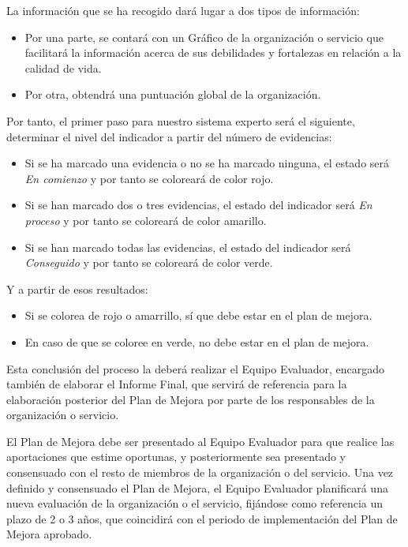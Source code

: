 La información que se ha recogido dará lugar a dos tipos de información: 
\begin{itemize}
	\item Por una parte, se contará con un Gráfico de la organización o servicio que facilitará la información acerca de sus debilidades y fortalezas en relación a la calidad de vida.
	\item Por otra, obtendrá una puntuación global de la organización. 
\end{itemize}

Por tanto, el primer paso para nuestro sistema experto será el siguiente, determinar el nivel del indicador a partir del número de evidencias:
\begin{itemize}
	\item Si se ha marcado una evidencia o no se ha marcado ninguna, el estado será \textit{En comienzo} y por tanto se coloreará de color rojo.
	\item Si se han marcado dos o tres evidencias, el estado del indicador será \textit{En proceso} y por tanto se coloreará de color amarillo.
	\item Si se han marcado todas las evidencias, el estado del indicador será \textit{Conseguido} y por tanto se coloreará de color verde.
\end{itemize}

Y a partir de esos resultados:
\begin{itemize}
	\item Si se colorea de rojo o amarrillo, sí que debe estar en el plan de mejora.
	\item En caso de que se coloree en verde, no debe estar en el plan de mejora.
\end{itemize}
 
Esta conclusión del proceso la deberá realizar el Equipo Evaluador, encargado
también de elaborar el Informe Final, que servirá de referencia
para la elaboración posterior del Plan de Mejora por parte de los
responsables de la organización o servicio.  
 
El Plan de Mejora debe ser presentado al Equipo Evaluador para que realice las
aportaciones que estime oportunas, y posteriormente sea presentado y consensuado
con el resto de miembros de la organización o del servicio. Una vez definido y
consensuado el Plan de Mejora, el Equipo Evaluador planificará una nueva
evaluación de la organización o el servicio, fijándose como referencia un plazo
de 2 o 3 años, que coincidirá con el periodo de implementación del Plan de
Mejora aprobado.

